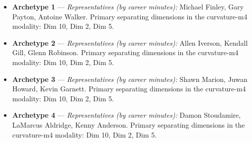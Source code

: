\begin{itemize}
\item \textbf{Archetype 1} --- \emph{Representatives (by career minutes):} Michael Finley, Gary Payton, Antoine Walker. Primary separating dimensions in the curvature-m4 modality: Dim 10, Dim 2, Dim 5.
\item \textbf{Archetype 2} --- \emph{Representatives (by career minutes):} Allen Iverson, Kendall Gill, Glenn Robinson. Primary separating dimensions in the curvature-m4 modality: Dim 10, Dim 2, Dim 5.
\item \textbf{Archetype 3} --- \emph{Representatives (by career minutes):} Shawn Marion, Juwan Howard, Kevin Garnett. Primary separating dimensions in the curvature-m4 modality: Dim 10, Dim 2, Dim 5.
\item \textbf{Archetype 4} --- \emph{Representatives (by career minutes):} Damon Stoudamire, LaMarcus Aldridge, Kenny Anderson. Primary separating dimensions in the curvature-m4 modality: Dim 10, Dim 2, Dim 5.
\end{itemize}
